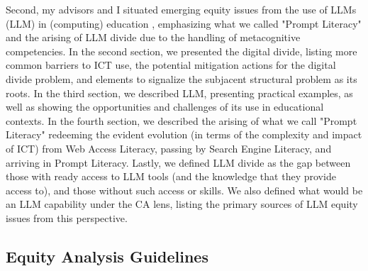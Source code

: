 Second, my advisors and I situated emerging equity issues from the use of \acrlong{LLM}s (\acrshort{LLM}) in (computing) education \cite{bispojr:2024-nmp}, emphasizing what we called "Prompt Literacy" and the arising of \gls{LLM}
divide due to the handling of metacognitive competencies. In the second section, we presented the digital divide, listing more common barriers to \gls{ICT} use, the potential mitigation actions for the digital divide problem, and elements to signalize the subjacent structural problem as its roots. In the third section, we described \gls{LLM}, presenting practical examples, as well as showing the opportunities and challenges of its use in educational contexts. In the fourth section, we described the arising of what we call "Prompt Literacy" redeeming the evident evolution (in terms of the complexity and impact of \gls{ICT}) from Web Access Literacy, passing by Search Engine Literacy, 
and arriving in Prompt Literacy. Lastly, we defined \gls{LLM} divide as the gap between those with ready access to \gls{LLM} tools (and the knowledge that they provide access to), and those without such access or skills. We also defined what would be an \gls{LLM} capability under the \gls{CA} lens, listing the primary sources of \gls{LLM} equity issues from this perspective.

\subsection{Equity Analysis Guidelines}
\label{disc-ss:eq-guidelines}

